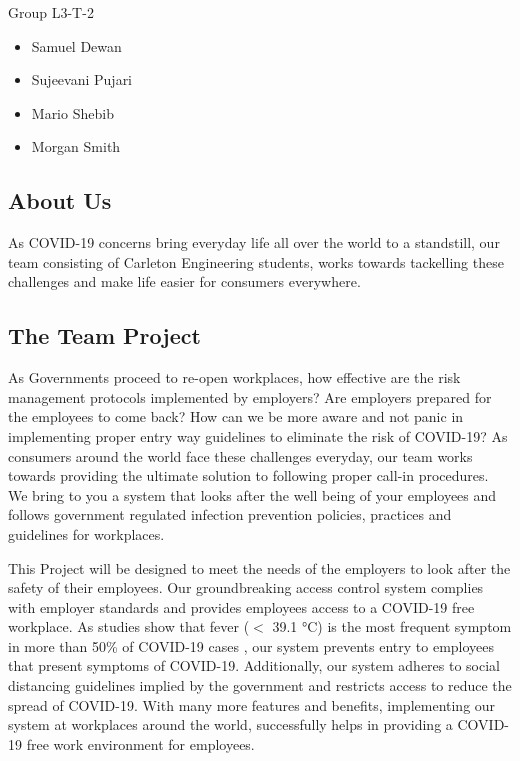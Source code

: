 Group L3-T-2
\begin{itemize}
    \item Samuel Dewan
    \item Sujeevani Pujari 
    \item Mario Shebib 
    \item Morgan Smith
\end{itemize}

\subsection{About Us}

As COVID-19 concerns bring everyday life all over the world to a standstill, our
team consisting of Carleton Engineering students, works towards tackelling these
challenges and make life easier for consumers everywhere.

\subsection{The Team Project} 

As Governments proceed to re-open workplaces, how effective are the risk
management protocols implemented by employers? Are employers prepared for the
employees to come back? How can we be more aware and not panic in implementing
proper entry way guidelines to eliminate the risk of COVID-19? As consumers
around the world face these challenges everyday, our team works towards
providing the ultimate solution to following proper call-in procedures. We bring
to you a system that looks after the well being of your employees and follows
government regulated infection prevention policies, practices and guidelines for
workplaces. 

This Project will be designed to meet the needs of the employers to look after
the safety of their employees. Our groundbreaking access control system complies
with employer standards and provides employees access to a COVID-19 free
workplace. As studies show that fever ($<$ 39.1 °C) is the most frequent symptom
in more than 50\% of COVID-19 cases \cite{Michelen_2020}, our system prevents
entry to employees that present symptoms of COVID-19. Additionally, our system
adheres to social distancing guidelines implied by the government and restricts
access to reduce the spread of COVID-19. With many more features and benefits,
implementing our system at workplaces around the world, successfully helps in
providing a COVID-19 free work environment for employees. 

